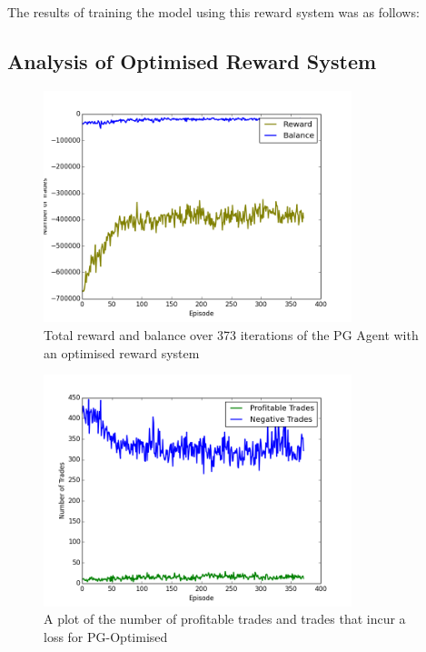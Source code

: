 \documentclass[ %
                    author={Ashwinder Khurana},
                supervisor={Prof Dave Cliff},
                    degree={MEng},
                     title={The Deeply Reinforced Trader},
                  subtitle={},
                      type={enterprise},
                      year={2020} ]{dissertation}
\begin{document}
{\\
\\

The results of training the model using this reward system was as follows:

\subsection{Analysis of Optimised Reward System}
\label{subsection:Analysis and Evaluation of PG Vanilla}
\begin{figure}[H]
	\centering
  	\includegraphics[width=0.8\textwidth]{PG-Optimised-Reward-vs-Balance}
  	\caption{Total reward and balance over 373 iterations of the PG Agent with an optimised reward system }
	\label{fig:PG-Optimised-Balance}  
\end{figure}




\begin{figure}[H] 
	\centering
  	\includegraphics[width=0.8\textwidth]{PG-Optimised-Good-vs-Bad}
  	\caption{A plot of the number of profitable trades and trades that incur a loss for PG-Optimised }
	\label{fig:PG-Optimised-Good-Vs-Bad}  
\end{figure}

}
\end{document}
